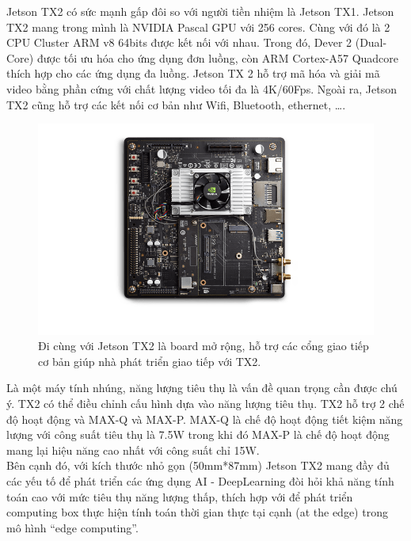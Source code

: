 \documentclass[a4paper]{report}
\begin{document}
Jetson TX2 có sức mạnh gấp đôi so với người tiền nhiệm là Jetson TX1. Jetson TX2 mang trong mình là NVIDIA Pascal GPU với 256 cores. Cùng với đó là 2 CPU Cluster ARM v8 64bits được kết nối với nhau. Trong đó, Dever 2 (Dual-Core) được tối ưu hóa cho ứng dụng đơn luồng, còn ARM Cortex-A57 Quadcore thích hợp cho các ứng dụng đa luồng. Jetson TX 2 hỗ trợ mã hóa và giải mã video bằng phần cứng với chất lượng video tối đa là 4K/60Fps. Ngoài ra, Jetson TX2 cũng hỗ trợ các kết nối cơ bản như Wifi, Bluetooth, ethernet, …. \\

\begin{figure}[h!]
	\centering
	\includegraphics[width=1\textwidth]{4_2_kit.png}
	\caption[Kit phát triển Jetson TX2]{Đi cùng với Jetson TX2 là board mở rộng, hỗ trợ các cổng giao tiếp cơ bản giúp nhà phát triển giao tiếp với TX2.}
\end{figure}

Là một máy tính nhúng, năng lượng tiêu thụ là vấn đề quan trọng cần được chú ý. TX2 có thể điều chỉnh cấu hình dựa vào năng lượng tiêu thụ. TX2 hỗ trợ 2 chế độ hoạt động và MAX-Q và MAX-P. MAX-Q là chế độ hoạt động tiết kiệm năng lượng với công suất tiêu thụ là 7.5W trong khi đó MAX-P là chế độ hoạt động mang lại hiệu năng cao nhất với công suất chỉ 15W.\\

Bên cạnh đó, với kích thước nhỏ gọn (50mm*87mm) Jetson TX2 mang đầy đủ các yếu tố để phát triển các ứng dụng AI -  DeepLearning đòi hỏi khả năng tính toán cao với mức tiêu thụ năng lượng thấp, thích hợp với để phát triển computing box thực hiện tính toán thời gian thực tại cạnh (at the edge) trong mô hình “edge computing”.
\\
\end{document}
